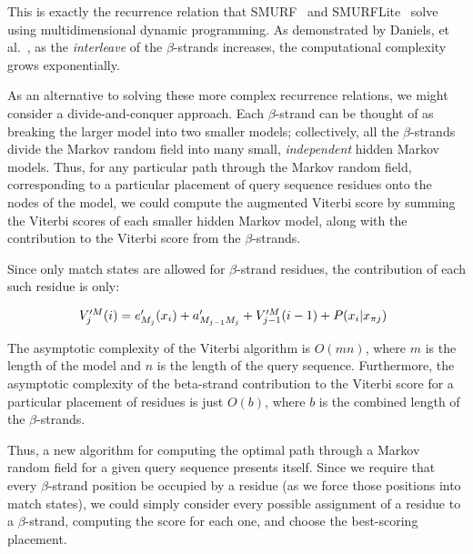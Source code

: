 \documentclass{acm_proc_article-sp}
\begin{document}
This is exactly the recurrence relation that SMURF~\cite{Menke:2010ti} and 
SMURFLite~\cite{Daniels:2012dg} solve using multidimensional dynamic 
programming.
As demonstrated by Daniels, et al.~\cite{Daniels:2012dg}, as the 
\emph{interleave} 
of the $\beta$-strands increases, the computational complexity grows 
exponentially.

As an alternative to solving these more complex recurrence relations, we might
consider a divide-and-conquer approach.
Each $\beta$-strand can be thought of as breaking the larger model into two 
smaller
models; collectively, all the $\beta$-strands divide the Markov random field 
into many small, \emph{independent} hidden Markov models.
Thus, for any particular path through the Markov random field, corresponding to
a particular placement of query sequence residues onto the nodes of the model,
we could compute the augmented Viterbi score by summing the Viterbi scores of
each smaller hidden Markov model, along with the contribution to the Viterbi
score from the $\beta$-strands.

Since only match states are allowed for $\beta$-strand residues, the 
contribution of each such residue is only:

\begin{equation}
  \begin{array}{@{}l@{}c@{}l}
  V_{j}^{\prime M}(i) = e^{\prime}_{M_{j}}(x_{i}) + 
  \vsum{V_{j-1}^{\prime M}(i - 1)} {a^{\prime}_{M_{j-1}M_{j}}} + P(x_{i}|x_{\pi j})
  \end{array}
\end{equation}

The asymptotic complexity of the Viterbi algorithm is $O(mn)$, where $m$ is the
length of the model and $n$ is the length of the query sequence.
Furthermore, the asymptotic complexity of the beta-strand contribution to the
Viterbi score for a particular placement of residues is just $O(b)$, where $b$
is the combined length of the $\beta$-strands.

Thus, a new algorithm for computing the optimal path through a Markov random 
field for a given query sequence presents itself.
Since we require that every $\beta$-strand position be occupied by a residue 
(as we force those positions into match states), we could simply consider every
possible assignment of a residue to a $\beta$-strand, computing the score for 
each one, and choose the best-scoring placement.
\end{document}
